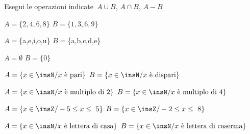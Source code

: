 \begin{esercizio}
\label{ese:7.57}
Esegui le operazioni indicate~$A\cup B$, $A\cap B$, $A-B$
\vspace{-6pt}

\begin{enumeratea}
\item $A=\{2,4,6,8\}$ $B=\{1,3,6,9\}$
\item $A=$\{a,e,i,o,u\} $B=$\{a,b,c,d,e\}
\item $A=\emptyset $ $B=\{0\}$
\item $A=\{x\in\insN/ x\text{ è pari}\}$ $B=\{x\in\insN/ x\text{ è dispari}\}$
\item $A=\{x\in\insN/ x\text{ è multiplo di~2}\}$ $B=\{x\in\insN/ x\text{ è 
multiplo di~4}\}$
\item $A=\{x\in\insZ/-5\le x\le~5\}$ $B=\{x\in\insZ/-2\le x\le~8\}$
\item $A=\{x\in\insN/ x\text{ è lettera di casa}\}$ $B=\{x\in\insN/ x\text{ è 
lettera di caserma}\}$
\end{enumeratea}
\end{esercizio}

